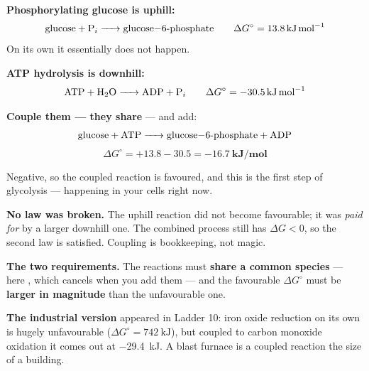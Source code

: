 \documentclass{apchem-worksheet}
\begin{document}
\begin{center}
\end{center}

\begin{workedexample}
\textbf{Phosphorylating glucose is uphill:}
\[ \ce{glucose + P_i -> glucose-6-phosphate}
   \qquad \Delta G^{\circ} = \SI{+13.8}{\kilo\joule\per\mole} \]
On its own it essentially does not happen.

\textbf{ATP hydrolysis is downhill:}
\[ \ce{ATP + H2O -> ADP + P_i}
   \qquad \Delta G^{\circ} = \SI{-30.5}{\kilo\joule\per\mole} \]

\textbf{Couple them --- they share } --- and add:
\[ \ce{glucose + ATP -> glucose-6-phosphate + ADP} \]
\[ \Delta G^{\circ} = +13.8 - 30.5
   = \mathbf{\SI{-16.7}{\kilo\joule\per\mole}} \]

Negative, so the coupled reaction is favoured, and this is the first
step of glycolysis --- happening in your cells right now.

\textbf{No law was broken.} The uphill reaction did not become
favourable; it was \emph{paid for} by a larger downhill one. The
combined process still has $\Delta G < 0$, so the second law is
satisfied. Coupling is bookkeeping, not magic.

\textbf{The two requirements.} The reactions must \textbf{share a
common species} --- here , which cancels when you add them ---
and the favourable $\Delta G^{\circ}$ must be \textbf{larger in
magnitude} than the unfavourable one.

\textbf{The industrial version} appeared in Ladder 10: iron oxide
reduction on its own is hugely unfavourable
($\Delta G^{\circ} = \SI{+742}{\kilo\joule}$), but coupled to carbon
monoxide oxidation it comes out at \SI{-29.4}{\kilo\joule}. A blast
furnace is a coupled reaction the size of a building.
\end{workedexample}
\end{document}
